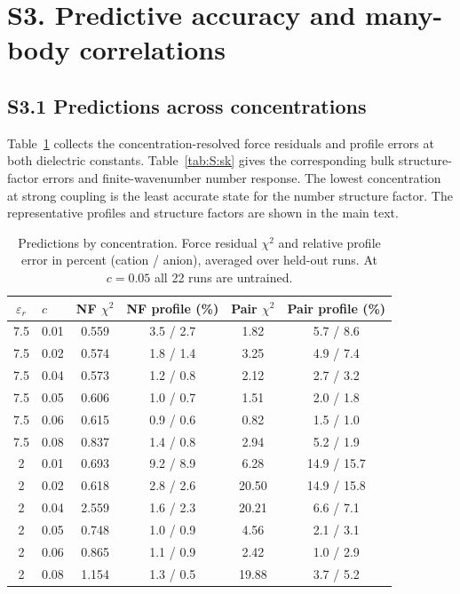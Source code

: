 \section*{S3. Predictive accuracy and many-body correlations}

\subsection*{S3.1 Predictions across concentrations}
Table~\ref{tab:S:profiles} collects the concentration-resolved force residuals and profile errors at both dielectric constants. Table~\ref{tab:S:sk} gives the corresponding bulk structure-factor errors and finite-wavenumber number response. The lowest concentration at strong coupling is the least accurate state for the number structure factor. The representative profiles and structure factors are shown in the main text.

\begin{table}[H]
\centering
\caption{Predictions by concentration. Force residual $\chi^2$ and relative profile error in percent (cation / anion), averaged over held-out runs. At $c=0.05$ all 22 runs are untrained.}
\label{tab:S:profiles}
\begin{tabular}{c l c c c c}
$\varepsilon_r$ & $c$ & NF $\chi^2$ & NF profile (\%) & Pair $\chi^2$ & Pair profile (\%)\\
\midrule
7.5 & 0.01 & 0.559 & 3.5 / 2.7 & 1.82 & 5.7 / 8.6\\
7.5 & 0.02 & 0.574 & 1.8 / 1.4 & 3.25 & 4.9 / 7.4\\
7.5 & 0.04 & 0.573 & 1.2 / 0.8 & 2.12 & 2.7 / 3.2\\
7.5 & 0.05 & 0.606 & 1.0 / 0.7 & 1.51 & 2.0 / 1.8\\
7.5 & 0.06 & 0.615 & 0.9 / 0.6 & 0.82 & 1.5 / 1.0\\
7.5 & 0.08 & 0.837 & 1.4 / 0.8 & 2.94 & 5.2 / 1.9\\
2 & 0.01 & 0.693 & 9.2 / 8.9 & 6.28 & 14.9 / 15.7\\
2 & 0.02 & 0.618 & 2.8 / 2.6 & 20.50 & 14.9 / 15.8\\
2 & 0.04 & 2.559 & 1.6 / 2.3 & 20.21 & 6.6 / 7.1\\
2 & 0.05 & 0.748 & 1.0 / 0.9 & 4.56 & 2.1 / 3.1\\
2 & 0.06 & 0.865 & 1.1 / 0.9 & 2.42 & 1.0 / 2.9\\
2 & 0.08 & 1.154 & 1.3 / 0.5 & 19.88 & 3.7 / 5.2\\
\bottomrule
\end{tabular}
\end{table}


